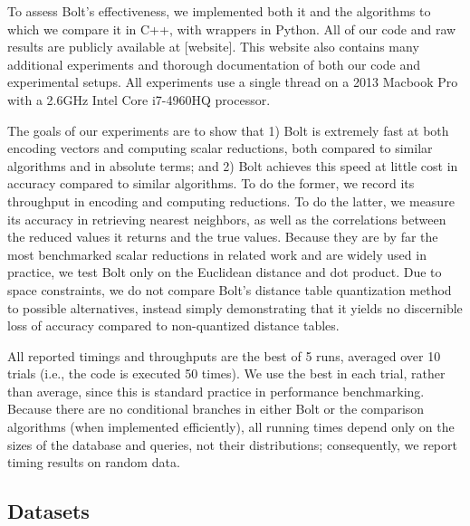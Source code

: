 
To assess Bolt's effectiveness, we implemented both it and the algorithms to which we compare it in C++, with wrappers in Python. All of our code and raw results are publicly available at [website]. This website also contains many additional experiments and thorough documentation of both our code and experimental setups. All experiments use a single thread on a 2013 Macbook Pro with a 2.6GHz Intel Core i7-4960HQ processor. %

The goals of our experiments are to show that 1) Bolt is extremely fast at both encoding vectors and computing scalar reductions, both compared to similar algorithms and in absolute terms; and 2) Bolt achieves this speed at little cost in accuracy compared to similar algorithms. To do the former, we record its throughput in encoding and computing reductions. To do the latter, we measure its accuracy in retrieving nearest neighbors, as well as the correlations between the reduced values it returns and the true values. Because they are by far the most benchmarked scalar reductions in related work and are widely used in practice, we test Bolt only on the Euclidean distance and dot product. Due to space constraints, we do not compare Bolt's distance table quantization method to possible alternatives, instead simply demonstrating that it yields no discernible loss of accuracy compared to non-quantized distance tables.

All reported timings and throughputs are the best of 5 runs, averaged over 10 trials (i.e., the code is executed 50 times). We use the best in each trial, rather than average, since this is standard practice in performance benchmarking. Because there are no conditional branches in either Bolt or the comparison algorithms (when implemented efficiently), all running times depend only on the sizes of the database and queries, not their distributions; consequently, we report timing results on random data.

\subsection{Datasets}

